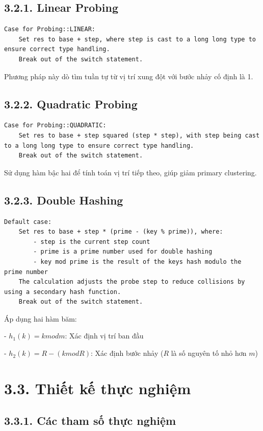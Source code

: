 \documentclass[12pt,a4paper]{report}
\begin{document}
\subsection*{3.2.1. Linear Probing}
\begin{lstlisting}[style=numbered]
Case for Probing::LINEAR:
    Set res to base + step, where step is cast to a long long type to ensure correct type handling.
    Break out of the switch statement.
\end{lstlisting}
Phương pháp này dò tìm tuần tự từ vị trí xung đột với bước nhảy cố định là 1.

\subsection*{3.2.2. Quadratic Probing}  
\begin{lstlisting}[style=numbered]
Case for Probing::QUADRATIC:
    Set res to base + step squared (step * step), with step being cast to a long long type to ensure correct type handling.
    Break out of the switch statement.
\end{lstlisting}
Sử dụng hàm bậc hai để tính toán vị trí tiếp theo, giúp giảm primary clustering.

\subsection*{3.2.3. Double Hashing}
\begin{lstlisting}[style=numbered]
Default case:
    Set res to base + step * (prime - (key % prime)), where:
        - step is the current step count
        - prime is a prime number used for double hashing
        - key mod prime is the result of the keys hash modulo the prime number
    The calculation adjusts the probe step to reduce collisions by using a secondary hash function.
    Break out of the switch statement.
\end{lstlisting}
Áp dụng hai hàm băm:

- $h_1(k) = k mod m$: Xác định vị trí ban đầu

- $h_2(k) = R - (k mod R)$: Xác định bước nhảy ($R$ là số nguyên tố nhỏ hơn $m$)

\section*{3.3. Thiết kế thực nghiệm}

\subsection*{3.3.1. Các tham số thực nghiệm}
\end{document}
